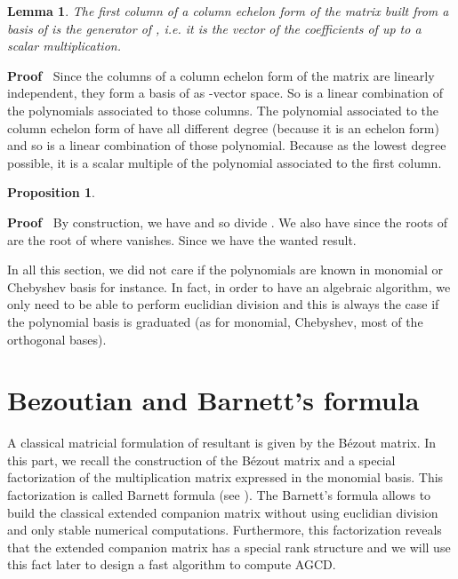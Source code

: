 \documentclass{article}
\newenvironment{proof}{\noindent\textbf{Proof\ }}{\hspace*{\fill}\medskip}
\newtheorem{lemma}{Lemma}
{\theorembodyfont{\rmfamily\small}\newtheorem{problem}{Problem}}
\newtheorem{proposition}{Proposition}
\begin{document}
\begin{lemma}
  The first column of a column echelon form of the matrix  built from a
  basis of  is the generator of , i.e. it is the vector of the coefficients of  up to a scalar
  multiplication.
\end{lemma}

\begin{proof}
  Since the columns of a column echelon form of the matrix  are linearly
  independent, they form a basis of  as
  -vector space. So  is a linear combination of the
  polynomials associated to those columns. The polynomial associated to the
  column echelon form of  have all different degree (because it is an
  echelon form) and so  is a linear combination of those polynomial.
  Because  as the lowest degree possible, it is a scalar multiple of
  the polynomial associated to the first column. 
\end{proof}

\begin{proposition}
  
\end{proposition}

\begin{proof}
  By construction, we have  and so  divide . We also have  since the roots of  are the root of  where  vanishes. Since  we have the wanted result.
\end{proof}

In all this section, we did not care if the polynomials are known in monomial
or Chebyshev basis for instance. In fact, in order to have an algebraic
algorithm, we only need to be able to perform euclidian division and this is
always the case if the polynomial basis is graduated (as for monomial,
Chebyshev, most of the orthogonal bases).



\section{Bezoutian and Barnett's formula\label{barnett}}



A classical matricial formulation of resultant is given by the B\'ezout
matrix. In this part, we recall the construction of the B\'ezout matrix and a
special factorization of the multiplication matrix expressed in the monomial
basis. This factorization is called Barnett formula (see {\cite{B}}). The
Barnett's formula allows to build the classical extended companion matrix
without using euclidian division and only stable numerical computations.
Furthermore, this factorization reveals that the extended companion matrix has
a special rank structure and we will use this fact later to design a fast
algorithm to compute AGCD.
\end{document}
